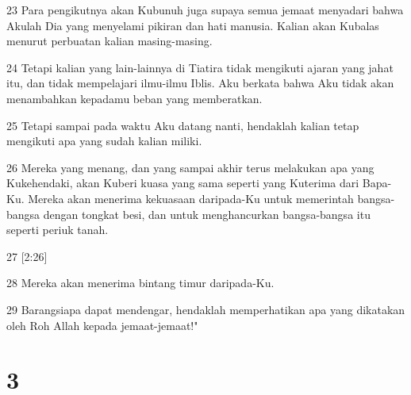 \par 23 Para pengikutnya akan Kubunuh juga supaya semua jemaat menyadari bahwa Akulah Dia yang menyelami pikiran dan hati manusia. Kalian akan Kubalas menurut perbuatan kalian masing-masing.
\par 24 Tetapi kalian yang lain-lainnya di Tiatira tidak mengikuti ajaran yang jahat itu, dan tidak mempelajari ilmu-ilmu Iblis. Aku berkata bahwa Aku tidak akan menambahkan kepadamu beban yang memberatkan.
\par 25 Tetapi sampai pada waktu Aku datang nanti, hendaklah kalian tetap mengikuti apa yang sudah kalian miliki.
\par 26 Mereka yang menang, dan yang sampai akhir terus melakukan apa yang Kukehendaki, akan Kuberi kuasa yang sama seperti yang Kuterima dari Bapa-Ku. Mereka akan menerima kekuasaan daripada-Ku untuk memerintah bangsa-bangsa dengan tongkat besi, dan untuk menghancurkan bangsa-bangsa itu seperti periuk tanah.
\par 27 [2:26]
\par 28 Mereka akan menerima bintang timur daripada-Ku.
\par 29 Barangsiapa dapat mendengar, hendaklah memperhatikan apa yang dikatakan oleh Roh Allah kepada jemaat-jemaat!"

\chapter{3}

